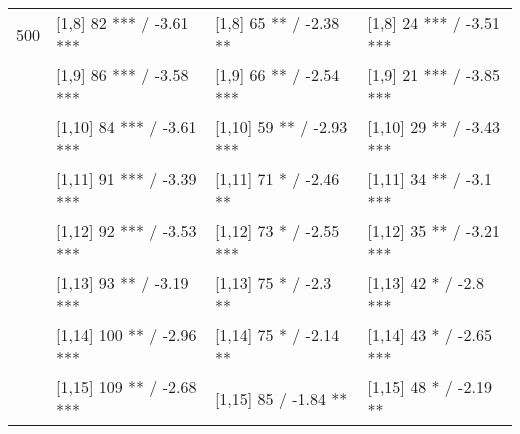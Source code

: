 \begin{table}
\begin{tabular}[t]{llll}
500 & {}[1,8] 82 *** / -3.61 *** & {}[1,8] 65 ** / -2.38 ** & {}[1,8] 24 *** / -3.51 ***\\
 & {}[1,9] 86 *** / -3.58 *** & {}[1,9] 66 ** / -2.54 *** & {}[1,9] 21 *** / -3.85 ***\\
 & {}[1,10] 84 *** / -3.61 *** & {}[1,10] 59 ** / -2.93 *** & {}[1,10] 29 ** / -3.43 ***\\
 & {}[1,11] 91 *** / -3.39 *** & {}[1,11] 71 * / -2.46 ** & {}[1,11] 34 ** / -3.1 ***\\
 & {}[1,12] 92 *** / -3.53 *** & {}[1,12] 73 * / -2.55 *** & {}[1,12] 35 ** / -3.21 ***\\
\addlinespace
 & {}[1,13] 93 ** / -3.19 *** & {}[1,13] 75 * / -2.3 ** & {}[1,13] 42 * / -2.8 ***\\
 & {}[1,14] 100 ** / -2.96 *** & {}[1,14] 75 * / -2.14 ** & {}[1,14] 43 * / -2.65 ***\\
 & {}[1,15] 109 ** / -2.68 *** & {}[1,15] 85  / -1.84 ** & {}[1,15] 48 * / -2.19 **\\
\bottomrule
\end{tabular}
\end{table}
